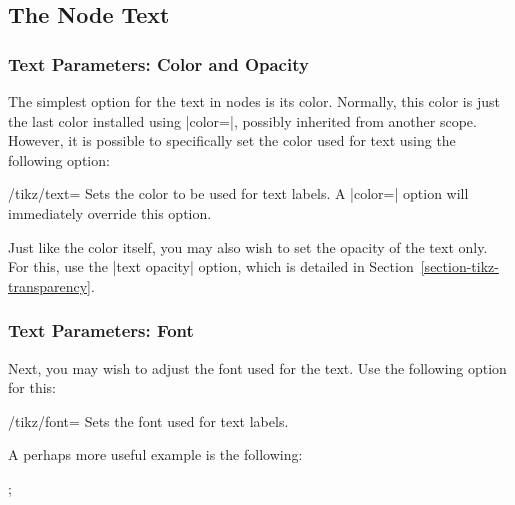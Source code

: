 \subsection{The Node Text}

\label{section-nodes-options}

\subsubsection{Text Parameters: Color and Opacity}

The simplest option for the text in nodes is its color. Normally, this
color is just the last color installed using |color=|, possibly
inherited from another scope. However, it is possible to specifically
set the color used for text using the following option:

\begin{key}{/tikz/text=}
  Sets the color to be used for text labels. A |color=| option
  will immediately override this option.
\begin{codeexample}[]
\end{codeexample}
\end{key}

Just like the color itself, you may also wish to set the opacity of
the text only. For this, use the |text opacity| option, which
is detailed in Section~\ref{section-tikz-transparency}.

\subsubsection{Text Parameters: Font}

Next, you may wish to adjust the font used for the text. Use the
following option for this:
\begin{key}{/tikz/font=}
  Sets the font used for text labels.
\begin{codeexample}[]
\end{codeexample}
  A perhaps more useful example is the following:

\begin{codeexample}[]
\tikz [every text node part/.style={font=\itshape},
       every lower node part/.style={font=\footnotesize}]
  ;
\end{codeexample}
\end{key}



